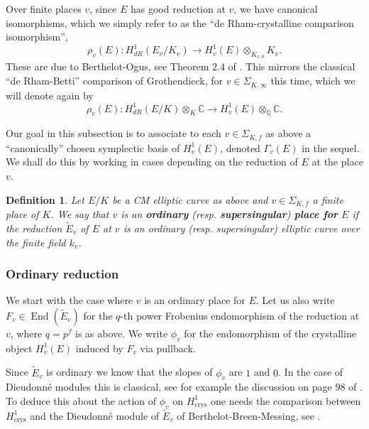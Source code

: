 \documentclass[12pt,twoside,a4paper]{article}
\theoremstyle{plain}%
\newtheorem{definition}[theorem]{Definition} %
\DeclareMathOperator{\End}{End}
\DeclareMathOperator{\crys}{crys}
\newcommand{\C}{\mathbb{C}}
\newcommand{\Q}{\mathbb{Q}}
\begin{document}
Over finite places $v$, since $E$ has good reduction at $v$, we have canonical isomorphisms, which we simply refer to as the ``de Rham-crystalline comparison isomorphism'',
\begin{equation}\label{eq:canoniso}
	\rho_v(E):H^1_{dR}(E_v/K_v)\rightarrow H^1_v(E)\otimes_{K_{v,0}} K_v.
\end{equation}These are due to Berthelot-Ogus, see Theorem $2.4$ of \cite{bertogus}. This mirrors the classical ``de Rham-Betti'' comparison of Grothendieck, for $v\in\Sigma_{K,\infty}$ this time, which we will denote again by 
\begin{equation}\label{eq:canonisobetti}
\rho_v(E):H^1_{dR}(E/K)\otimes_K \C \rightarrow H^1_v(E)\otimes_{\Q} \C.
\end{equation}

	Our goal in this subsection is to associate to each $v\in\Sigma_{K,f}$ as above a ``canonically'' chosen symplectic basis of $H^1_v(E)$, denoted $\Gamma_v(E)$ in the sequel. We shall do this by working in cases depending on the reduction of $E$ at the place $v$.
	
	\begin{definition}Let $E/K$ be a CM elliptic curve as above and $v\in\Sigma_{K,f}$ a finite place of $K$. We say that $v$ is an \textbf{ordinary} (resp. \textbf{supersingular}) \textbf{place for }$E$ if the reduction $\tilde{E}_v$ of $E$ at $v$ is an ordinary (resp. supersingular) elliptic curve over the finite field $k_v$.\end{definition}
	
	\subsubsection{Ordinary reduction}\label{section:ordredbases}
	
We start with the case where $v$ is an ordinary place for $E$. Let us also write $F_v\in \End(\tilde{E}_v)$ for the $q$-th power Frobenius endomorphism of the reduction at $v$, where $q=p^f$ is as above. We write $\phi_{v}$ for the endomorphism of the crystalline object $H^1_v(E)$ induced by $F_v$ via pullback. 
	
	Since $\tilde{E}_v$ is ordinary we know that the slopes of $\phi_v$ are $1$ and $0$. In the case of Dieudonn\'e modules this is classical, see for example the discussion on page $98$ of \cite{demazure}. To deduce this about the action of $\phi_v$ on $H^1_{\crys}$ one needs the comparison between $H^1_{\crys}$ and the Dieudonn\'e module of $\tilde{E}_v$ of Berthelot-Breen-Messing, see \cite{berbreenmessing}.
	
\end{document}
